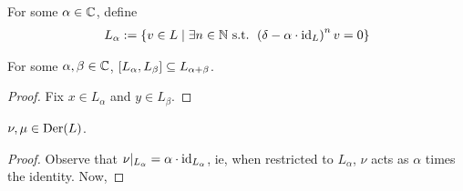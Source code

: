 \begin{definition}
    For some $\alpha \in \mathbb{C}$, define 
    \begin{align*}
        L_{\alpha} := \left\{ v \in L \; \middle\vert \; \exists n \in \mathbb{N} \text{ s.t. } \left( \delta - \alpha \cdot \operatorname{id}_L \right)^n v = 0 \right\}
    \end{align*}
\end{definition}

\begin{lemma}\label{Ch2:Lemma:BracGenEigenspJordan}
    For some $\alpha, \beta \in \mathbb{C}$, $\left[ L_{\alpha}, L_{\beta} \right] \subseteq L_{\alpha + \beta}$.
\end{lemma}
\begin{proof}
    Fix $x \in L_{\alpha}$ and $y \in L_{\beta}$. 
    \sorry
\end{proof}

\begin{lemma}
    $\nu, \mu \in \operatorname{Der}\!\left( L \right)$.
\end{lemma}
\begin{proof}
    Observe that $\nu\vert_{L_{\alpha}} = \alpha \cdot {\operatorname{id}}_{L_{\alpha}}$, ie, when restricted to $L_{\alpha}$, $\nu$ acts as $\alpha$ times the identity. Now, \sorry
\end{proof}


